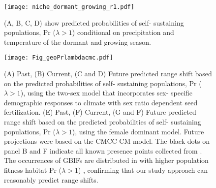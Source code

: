 \documentclass[9pt,twocolumn,twoside,lineno]{pnas-new}
\newcommand{\revise}[1]{{\color{Mahogany}{#1}}}
\begin{document}
\begin{figure}[H]
\centering
\texttt{[image: niche\_dormant\_growing\_r1.pdf]}
\caption{ \revise{Niche suitability across seasonal climate space predicted by female-dominant and the two-sex models.} 
			(A, B, C, D)  show predicted probabilities of self- sustaining populations, Pr ($\lambda > 1$) conditional on precipitation and temperature of the dormant and growing season.
			\revise{(E, F) show difference in niche estimation between the female dominant model and the two-sex model for each season.
			The pink color indicates the female dominant (F) while the violet represents the two-sex models (FM).
			The dash line represents the mean probability for each model.}
			}
\label{fig:niche}
\end{figure}
\clearpage

\begin{figure}[H]
\centering
\texttt{[image: Fig\_geoPrlambdacmc.pdf]}
\caption{\revise{Geographic projections of population viability predicted by female-dominant and the two-sex models.}
			(A) Past, (B) Current, (C and D) Future predicted range shift based on the predicted probabilities of self- sustaining populations, Pr ($\lambda > 1$), using the two-sex model that incorporates sex- specific demographic responses to climate with sex ratio dependent seed fertilization.
			(E) Past, (F) Current, (G and F) Future  predicted range shift based on the predicted probabilities of self- sustaining populations, Pr ($\lambda > 1$), using the female dominant model.
			Future projections were based on the CMCC-CM model.
			The black dots on panel B and F indicate all known presence points collected from \revise{Global Biodiversity Information Facility}. 
			The occurrences of GBIFs are distributed in with higher population fitness habitat Pr ($\lambda > 1$) , confirming that our study approach can reasonably predict range shifts. 
			}
\label{fig:geoprojcmc}
\end{figure}
\end{document}
